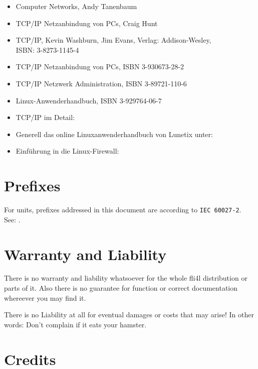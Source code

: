    \begin{itemize}
    \item Computer Networks, Andy Tanenbaum
    \item TCP/IP Netzanbindung von PCs, Craig Hunt
    \item TCP/IP, Kevin Washburn, Jim Evans, Verlag: Addison-Wesley, \\ISBN: 3-8273-1145-4
    \item TCP/IP Netzanbindung von PCs, ISBN 3-930673-28-2
    \item TCP/IP Netzwerk Administration, ISBN 3-89721-110-6
    \item Linux-Anwenderhandbuch, ISBN 3-929764-06-7
    \item TCP/IP im Detail:\\
    \item Generell das online Linuxanwenderhandbuch von Lunetix unter:\\
    \item Einführung in die Linux-Firewall:
    \end{itemize}

    \section{Prefixes}

    For units, prefixes addressed in this document are according to \verb+IEC 60027-2+.\\
    See: .

    \section{Warranty and Liability}

    There is no warranty and liability whatsoever for the whole fli4l
    distribution or parts of it. Also there is no guarantee for
    function or correct documentation whereever you may find it.
    
    There is no Liability at all for eventual damages or costs that
    may arise! In other words: Don't complain if it eats your hamster.

    \section{Credits}
    \newcommand{\membermail}[3]{\multicolumn{2}{l}{#1 (\emph{#2})}\\\nopagebreak & \email{#3}\\}
    \newcommand{\member}[2]{#1 (\emph{#2})\\}
    \newcommand{\personmail}[2]{#1 & \email{#2}\\}
    \newcommand{\person}[1]{#1\\}
    
